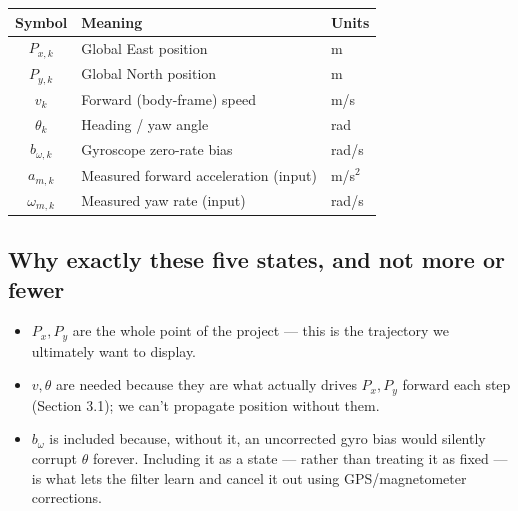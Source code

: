 \documentclass[11pt,a4paper]{article}
\begin{document}
\begin{center}
\begin{tabular}{@{}cll@{}}
\toprule
Symbol & Meaning & Units \\
\midrule
$P_{x,k}$ & Global East position & m \\
$P_{y,k}$ & Global North position & m \\
$v_k$ & Forward (body-frame) speed & m/s \\
$\theta_k$ & Heading / yaw angle & rad \\
$b_{\omega,k}$ & Gyroscope zero-rate bias & rad/s \\
$a_{m,k}$ & Measured forward acceleration (input) & m/s$^2$ \\
$\omega_{m,k}$ & Measured yaw rate (input) & rad/s \\
\bottomrule
\end{tabular}
\end{center}

\subsection*{Why exactly these five states, and not more or fewer}
\begin{itemize}
    \item $P_x, P_y$ are the whole point of the project --- this is the trajectory we ultimately want to display.
    \item $v, \theta$ are needed because they are what actually drives $P_x, P_y$ forward each step (Section 3.1); we can't propagate position without them.
    \item $b_\omega$ is included because, without it, an uncorrected gyro bias would silently corrupt $\theta$ forever. Including it as a state --- rather than treating it as fixed --- is what lets the filter learn and cancel it out using GPS/magnetometer corrections.
\end{itemize}
\end{document}
